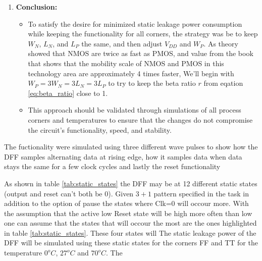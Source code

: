 \begin{enumerate}
    \item \textbf{Conclusion:}
    \begin{itemize}
        \item To satisfy the desire for minimized static leakage power consumption while keeping the functionality for all corners, the strategy was be to keep $W_N$, $L_N$, and $L_P$ the same, and then adjust $V_{DD}$ and $W_P$. As theory showed that NMOS are twice as fast as PMOS, and value from the book that shows that the mobility scale of NMOS and PMOS in this technology area are approximately 4 times faster, We'll begin with $W_P=3W_N=3L_N=3L_P$ to try to keep the beta ratio $r$ from eqation \ref{eq:beta_ratio} close to 1. 
        \item This approach should be validated through simulations of all process corners and temperatures to ensure that the changes do not compromise the circuit's functionality, speed, and stability.
    \end{itemize}
\end{enumerate}

The fuctionality were simulated using three different wave pulses to show how the DFF samples alternating data at rising edge, how it samples data when data stays the same for a few clock cycles and lastly the reset functionality

As shown in table \ref{tab:static_states} the DFF may be at 12 different static states (output and reset can't both be 0). Given $3+1$ pattern specified in the task in addition to the option of pause the states where Clk=0 will occour more. With the assumption that the active low Reset state will be high more often than low one can assume that the states that will occour the most are the ones highlighted in table \ref{tab:static_states}. These four states will  The static leakage power of the DFF will be simulated using these static states for the corners FF and TT for the temperature $0^oC$, $27^oC$ and $70^oC$. The 

